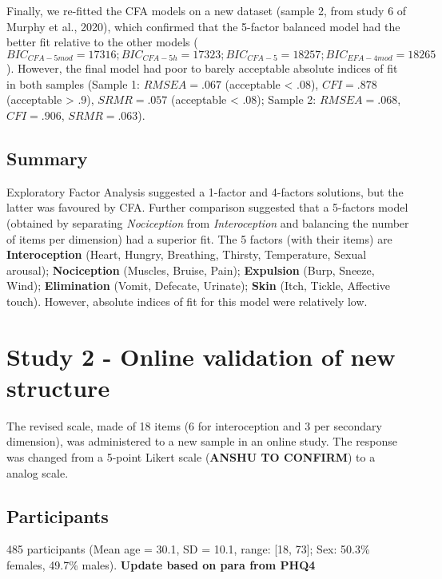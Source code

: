 \documentclass[
  man,floatsintext]{apa6}
\begin{document}
Finally, we re-fitted the CFA models on a new dataset (sample 2, from study 6 of Murphy et al., 2020), which confirmed that the 5-factor balanced model had the better fit relative to the other models (\(BIC_{CFA-5mod} = 17316; BIC_{CFA-5h} = 17323; BIC_{CFA-5} = 18257; BIC_{EFA-4mod} = 18265\)). However, the final model had poor to barely acceptable absolute indices of fit in both samples (Sample 1: \(RMSEA = .067\) (acceptable \textless{} .08), \(CFI = .878\) (acceptable \textgreater{} .9), \(SRMR = .057\) (acceptable \textless{} .08); Sample 2: \(RMSEA = .068\), \(CFI = .906\), \(SRMR = .063\)).

\hypertarget{summary}{%
\subsection{Summary}\label{summary}}

Exploratory Factor Analysis suggested a 1-factor and 4-factors solutions, but the latter was favoured by CFA. Further comparison suggested that a 5-factors model (obtained by separating \emph{Nociception} from \emph{Interoception} and balancing the number of items per dimension) had a superior fit. The 5 factors (with their items) are \textbf{Interoception} (Heart, Hungry, Breathing, Thirsty, Temperature, Sexual arousal); \textbf{Nociception} (Muscles, Bruise, Pain); \textbf{Expulsion} (Burp, Sneeze, Wind); \textbf{Elimination} (Vomit, Defecate, Urinate); \textbf{Skin} (Itch, Tickle, Affective touch). However, absolute indices of fit for this model were relatively low.

\hypertarget{study-2---online-validation-of-new-structure}{%
\section{Study 2 - Online validation of new structure}\label{study-2---online-validation-of-new-structure}}

The revised scale, made of 18 items (6 for interoception and 3 per secondary dimension), was administered to a new sample in an online study. The response was changed from a 5-point Likert scale (\textbf{ANSHU TO CONFIRM}) to a analog scale.

\hypertarget{participants-1}{%
\subsection{Participants}\label{participants-1}}

485 participants (Mean age = 30.1, SD = 10.1, range: {[}18, 73{]}; Sex: 50.3\% females, 49.7\% males).
\textbf{Update based on para from PHQ4}
\end{document}
